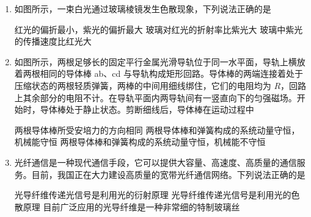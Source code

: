 \documentclass[\gkver]{gaokaozhenti}
\begin{document}
\begin{enumerate}
{气体的压强增大}
{气体分子的平均动能减小}
{每秒撞击单位面积器壁的气体分子数增多}


\item
如图所示，一束白光通过玻璃棱镜发生色散现象，下列说法正确的是


{红光的偏折最小，紫光的偏折最大}
{玻璃对红光的折射率比紫光大}
{玻璃中紫光的传播速度比红光大}


\item
如图所示，两根足够长的固定平行金属光滑导轨位于同一水平面，导轨上横放着两根相同的导体棒 ab、cd 与导轨构成矩形回路。导体棒的两端连接着处于压缩状态的两根轻质弹簧，两棒的中间用细线绑住，它们的电阻均为 $R$，回路上其余部分的电阻不计。在导轨平面内两导轨间有一竖直向下的匀强磁场。开始时，导体棒处于静止状态。剪断细线后，导体棒在运动过程中


{两根导体棒所受安培力的方向相同}
{两根导体棒和弹簧构成的系统动量守恒，机械能守恒}
{两根导体棒和弹簧构成的系统动量守恒，机械能不守恒}


\item
光纤通信是一种现代通信手段，它可以提供大容量、高速度、高质量的通信服务。目前，我国正在大力建设高质量的宽带光纤通信网络。下列说法正确的是

{光导纤维传递光信号是利用光的衍射原理}
{光导纤维传递光信号是利用光的色散原理}
{目前广泛应用的光导纤维是一种非常细的特制玻璃丝}


\end{enumerate}
\end{document}
